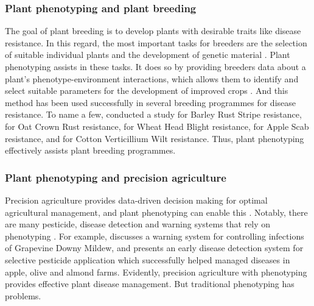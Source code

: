 \subsubsection{Plant phenotyping and plant breeding}
The goal of plant breeding is to develop plants with desirable traits like disease resistance. In this regard, the most important tasks for breeders are the selection of suitable individual plants and the development of genetic material \cite{anandBreedingTechniquesDispense2023}. Plant phenotyping assists in these tasks. It does so by providing breeders data about a plant's phenotype-environment interactions, which allows them to identify and select suitable parameters for the development of improved crops \cite{xiaoAdvancedHighthroughputPlant2022}. And this method has been used successfully in several breeding programmes for disease resistance. To name a few, \cite{visioniGenomeWideAssociation2018} conducted a study for Barley Rust Stripe resistance, \cite{zhuIdentificationQuantitativeTrait2003} for Oat Crown Rust resistance, \cite{pumphreyValidatingFhb1QTL2007} for Wheat Head Blight resistance, \cite{mcclureGenomeWideAssociationStudy2018} for Apple Scab resistance, and \cite{yangGbvdr6GeneEncoding2018} for Cotton Verticillium Wilt resistance. Thus, plant phenotyping effectively assists plant breeding programmes.

\subsubsection{Plant phenotyping and precision agriculture}
Precision agriculture provides data-driven decision making for optimal agricultural management, and plant phenotyping can enable this \cite{zhuDeepLearningbasedText2025, qiaoEditorialAISensors2022, reiser3DImagingSonar2017, dechantAutomatedIdentificationNorthern2017, bergerPrecisionAgricultureEnabler2022}. Notably, there are many pesticide, disease detection and warning systems that rely on phenotyping \cite{khalidRealTimePlantHealth2023, kitpoEarlyRiceDisease2018}. For example, \cite{caffiEvaluationWarningSystem2010} discusses a warning system for controlling infections of Grapevine Downy Mildew, and \cite{bergerZoneSelectivePlantProtection2022} presents an early disease detection system for selective pesticide application which successfully helped managed diseases in apple, olive and almond farms. Evidently, precision agriculture with phenotyping provides effective plant disease management. But traditional phenotyping has problems.


